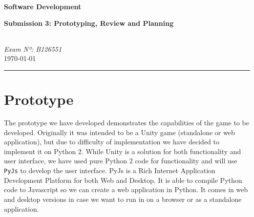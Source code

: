 \documentclass{article}
\begin{document}
\begin{center}
	\begin{Huge}
	\textbf{Software Development}\\
	\end{Huge}
	\begin{small}
		\textbf{Submission 3: Prototyping, Review and Planning}
	\end{small}
\end{center}

\begin{small}
\textit{\\Exam Nº: B126551}\\
\today
\end{small}

\begin{center}
	\noindent\rule[0.5ex]{\linewidth}{1pt}
\end{center}

\section{Prototype}
The prototype we have developed demonstrates the capabilities of the game to be developed. Originally it was intended to be a Unity game (standalone or web application), but due to difficulty of implementation we have decided to implement it on Python 2. While Unity is a solution for both functionality and user interface, we have used pure Python 2 code for functionality and will use \texttt{PyJs} to develop the user interface. PyJs is a Rich Internet Application Development Platform for both Web and Desktop. It is able to compile Python code to Javascript so we can create a web application in Python. It comes in web and desktop versions in case we want to run in on a browser or as a standalone application.
\end{document}
